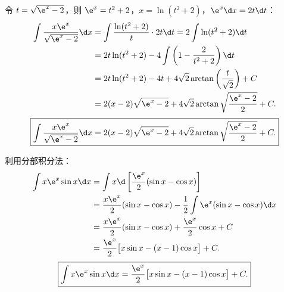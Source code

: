 \begin{solution}
    令 $t = \sqrt{\e^x - 2}$，则 $\e^x = t^2 + 2$，$x = \ln(t^2 + 2)$，$\e^x \d x = 2t \d t$：
    \begin{equation}
        \begin{aligned}
            \int \frac{x\e^x}{\sqrt{\e^x - 2}} \d x & = \int \frac{\ln(t^2 + 2)}{t} \cdot 2t \d t = 2\int \ln(t^2 + 2) \d t         \\
                                                    & = 2t\ln(t^2 + 2) - 4\int \left( 1 - \frac{2}{t^2 + 2} \right) \d t            \\
                                                    & = 2t\ln(t^2 + 2) - 4t + 4\sqrt{2}\arctan\left( \frac{t}{\sqrt{2}} \right) + C \\
                                                    & = 2(x - 2)\sqrt{\e^x - 2} + 4\sqrt{2}\arctan\sqrt{\frac{\e^x - 2}{2}} + C.
        \end{aligned}
    \end{equation}
    \begin{equation}
        \boxed{\int \frac{x\e^x}{\sqrt{\e^x - 2}} \d x = 2(x - 2)\sqrt{\e^x - 2} + 4\sqrt{2}\arctan\sqrt{\frac{\e^x - 2}{2}} + C.}
    \end{equation}


    利用分部积分法：
    \begin{equation}
        \begin{aligned}
            \int x \e^x \sin x \d x & = \int x \d\left[ \frac{\e^x}{2}(\sin x - \cos x) \right]                        \\
                                    & = \frac{x\e^x}{2}(\sin x - \cos x) - \frac{1}{2}\int \e^x (\sin x - \cos x) \d x \\
                                    & = \frac{x\e^x}{2}(\sin x - \cos x) + \frac{\e^x}{2}\cos x + C                    \\
                                    & = \frac{\e^x}{2}\bigl[ x\sin x - (x - 1)\cos x \bigr] + C.
        \end{aligned}
    \end{equation}
    \begin{equation}
        \boxed{\int x \e^x \sin x \d x = \frac{\e^x}{2}\bigl[ x\sin x - (x - 1)\cos x \bigr] + C.}
    \end{equation}



\end{solution}
